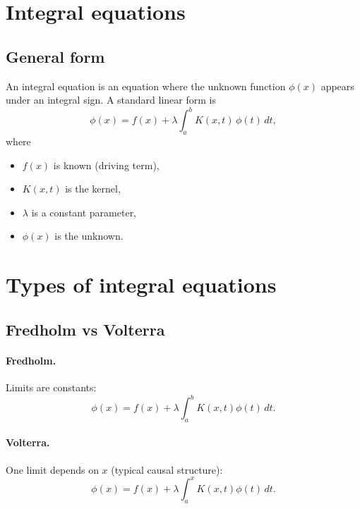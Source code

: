 
\section{Integral equations}

\subsection{General form}
An integral equation is an equation where the unknown function $\phi(x)$ appears under
an integral sign. A standard linear form is
\begin{equation}
\phi(x) = f(x) + \lambda \int_a^b K(x,t)\,\phi(t)\,dt,
\end{equation}
where
\begin{itemize}
\item $f(x)$ is known (driving term),
\item $K(x,t)$ is the kernel,
\item $\lambda$ is a constant parameter,
\item $\phi(x)$ is the unknown.
\end{itemize}


\section{Types of integral equations}

\subsection{Fredholm vs Volterra}
\paragraph{Fredholm.}
Limits are constants:
\begin{equation}
\phi(x) = f(x) + \lambda \int_a^b K(x,t)\phi(t)\,dt.
\end{equation}

\paragraph{Volterra.}
One limit depends on $x$ (typical causal structure):
\begin{equation}
\phi(x) = f(x) + \lambda \int_a^x K(x,t)\phi(t)\,dt.
\end{equation}

